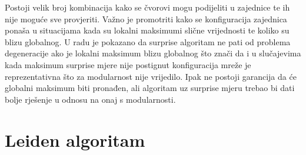 Postoji velik broj kombinacija kako se čvorovi mogu podijeliti u zajednice te ih nije moguće sve provjeriti. Važno je promotriti kako se konfiguracija zajednica ponaša u situacijama kada su lokalni maksimumi slične vrijednosti te koliko su blizu globalnog. U radu \cite{gamermann2022algorithm} je pokazano da surprise algoritam ne pati od problema degeneracije ako je lokalni maksimum blizu globalnog što znači da i u slučajevima kada maksimum surprise mjere nije postignut konfiguracija mreže je reprezentativna što za modularnost nije vrijedilo. Ipak ne postoji garancija da će globalni maksimum biti pronađen, ali algoritam uz surprise mjeru trebao bi dati bolje rješenje u odnosu na onaj s modularnosti.


\section{Leiden algoritam}